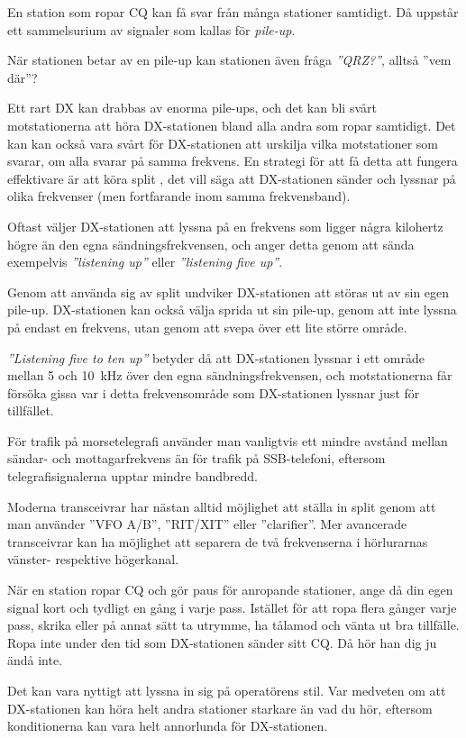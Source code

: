 En station som ropar CQ kan få svar från många stationer samtidigt.
Då uppstår ett sammelsurium av signaler som kallas för \emph{pile-up}.

När stationen betar av en pile-up kan stationen även fråga \emph{''QRZ?''},
alltså ''vem där''?

Ett rart DX kan drabbas av enorma pile-ups, och det kan bli svårt
motstationerna att höra DX-stationen bland alla andra som ropar samtidigt.
Det kan kan också vara svårt för DX-stationen att urskilja vilka motstationer
som svarar, om alla svarar på samma frekvens.
En strategi för att få detta att fungera effektivare är att köra split
\cite{LowBandDX}, det vill säga att DX-stationen sänder och lyssnar på olika
frekvenser (men fortfarande inom samma frekvensband).

Oftast väljer DX-stationen att lyssna på en frekvens som ligger några kilohertz
högre än den egna sändningsfrekvensen, och anger detta genom att sända
exempelvis \emph{''listening up''} eller \emph{''listening five up''}.

Genom att använda sig av split undviker DX-stationen att störas ut av sin egen
pile-up.
DX-stationen kan också välja sprida ut sin pile-up, genom att inte lyssna på
endast en frekvens, utan genom att svepa över ett lite större område.

\emph{''Listening five to ten up''} betyder då att DX-stationen lyssnar i ett
område mellan 5 och \qty{10}{\kilo\hertz} över den egna sändningsfrekvensen, och
motstationerna får försöka gissa var i detta frekvensområde som DX-stationen
lyssnar just för tillfället.

För trafik på morsetelegrafi använder man vanligtvis ett mindre avstånd mellan
sändar- och mottagarfrekvens än för trafik på SSB-telefoni, eftersom
telegrafisignalerna upptar mindre bandbredd.

Moderna transceivrar har nästan alltid möjlighet att ställa in split genom att
man använder ''VFO A/B'', ''RIT/XIT'' eller ''clarifier''.
Mer avancerade transceivrar kan ha möjlighet att separera de två frekvenserna i
hörlurarnas vänster- respektive högerkanal.

När en station ropar CQ och gör paus för anropande stationer, ange då din egen
signal kort och tydligt en gång i varje pass.
Istället för att ropa flera gånger varje pass, skrika eller på annat sätt
ta utrymme, ha tålamod och vänta ut bra tillfälle.
Ropa inte under den tid som DX-stationen sänder sitt CQ. Då hör han dig ju ändå inte.

Det kan vara nyttigt att lyssna in sig på operatörens stil.
Var medveten om att DX-stationen kan höra helt andra stationer starkare än vad
du hör, eftersom konditionerna kan vara helt annorlunda för DX-stationen.

